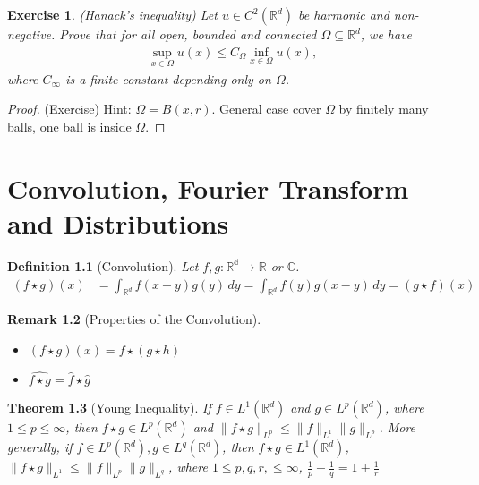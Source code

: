 \documentclass{report}
\theoremstyle{tommy}
\newtheorem{defn}{Definition}
\newtheorem{thm}[defn]{Theorem}
\newtheorem{rem}[defn]{Remark}
\newtheorem{ex}[defn]{Exercise}
\begin{document}
  \begin{ex} (Hanack's inequality)
    Let \(u \in C^2(\mathbb{R}^d)\) be harmonic and non-negative. Prove that for all open, bounded and connected \(\Omega \subseteq \mathbb{R}^d\), we have
    \begin{align*}
      \sup_{x \in \Omega} u(x) \le C_\Omega \inf_{x \in \Omega} u(x),
    \end{align*}
    where \(C_\infty\) is a finite constant depending only on \(\Omega\).
  \end{ex}

  \begin{proof} (Exercise)
    Hint: \(\Omega = B(x,r)\). General case cover \(\Omega\) by finitely many balls, one ball is inside \(\Omega\).
  \end{proof}


  \chapter{Convolution, Fourier Transform and Distributions}


  \begin{defn}[Convolution]
    Let \(f, g: \mathbb{{R}^d \to \mathbb{R}}\) or \(\mathbb{C}\).
    \begin{align*}
      (f \star g)(x)
      &= \int_{\mathbb{R}^d} f(x-y) g(y) \, dy
      = \int_{\mathbb{R}^d} f(y) g(x-y) \, dy 
      = (g \star f)(x)
    \end{align*}
  \end{defn}

  \begin{rem}[Properties of the Convolution]
    \begin{itemize}
      \item \((f \star g)(x) = f \star (g \star h)\)
      \item \(\hat{f \star g} = \hat f \star \hat g\)
    \end{itemize}
  \end{rem}


  \begin{thm}[Young Inequality]
    If \(f \in L^1(\mathbb{R}^d)\) and \(g \in L^p(\mathbb{R}^d)\), where \(1 \le p \le \infty\), then \(f \star g \in L^p(\mathbb{R}^d)\) and \(\|f \star g \|_{L^p} \le \|f\|_{L^1} \|g\|_{L^p}\). More generally, if \(f \in L^p(\mathbb{R}^d), g \in L^q(\mathbb{R}^d)\), then \(f \star g \in L^1(\mathbb{R}^d)\), \(\| f \star g\|_{L^1} \le \|f\|_{L^p} \|g\|_{L^q}\), where \(1 \le p, q, r, \le \infty\), \(\frac{1}{p} + \frac{1}{q} = 1 + \frac{1}{r}\)
  \end{thm}
\end{document}

